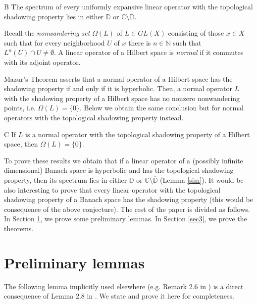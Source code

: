 \documentclass[11pt,letterpaper]{amsart}
\numberwithin{equation}{section}
\begin{document}
\begin{customthm}{B}
\label{c-1}
The spectrum of every uniformly expansive linear operator with the topological shadowing property lies in either $\mathbb{D}$ or $\mathbb{C} \setminus \overline{\mathbb{D}}$.
\end{customthm}

Recall the {\em nonwandering set} $\Omega(L)$ of $L\in GL(X)$ consisting of those $x\in X$ such that
for every neighborhood $U$ of $x$ there is $n\in\mathbb{N}$ such that
$L^n(U)\cap U\neq\emptyset$.
A linear operator of a Hilbert space is {\em normal} if it commutes with its adjoint operator.

Mazur's Theorem \cite{ma} asserts that a normal operator of a Hilbert space has the shadowing property if and only if it is hyperbolic.
Then, a normal operator $L$ with the shadowing property of a Hilbert space has no nonzero nonwandering points, i.e. $\Omega(L)=\{0\}$.
Below we obtain the same conclusion but for normal operators with the topological shadowing property instead.

\begin{customthm}{C}
\label{c-2}
If $L$ is a normal operator with the topological shadowing property of a Hilbert space, then $\Omega(L)=\{0\}$.
\end{customthm}


To prove these results we obtain that if a linear operator of a (possibly infinite dimensional) Banach space is hyperbolic and has the topological shadowing property, then its spectrum lies in either $\mathbb{D}$ or $\mathbb{C}\setminus \overline{\mathbb{D}}$ (Lemma \ref{sim}).
It would be also interesting to prove that
every linear operator with the topological shadowing property of a Banach space has the shadowing property (this would be consequence of the above conjecture).
The rest of the paper is divided as follows. In Section \ref{sec2}, we prove some preliminary lemmas. In Section \ref{sec3}, we prove the theorems.





\section{Preliminary lemmas}
\label{sec2}





\noindent
The following lemma implicitly used elsewhere (e.g. Remark 2.6 in \cite{c}) is a direct consequence of Lemma 2.8 in \cite{lny}.
We state and prove it here for completeness.
\end{document}
